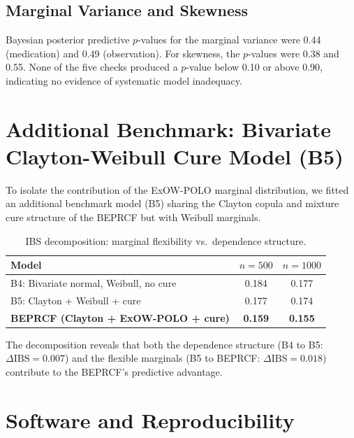 \documentclass[12pt,a4paper]{article}
\begin{document}
\subsection{Marginal Variance and Skewness}

Bayesian posterior predictive $p$-values for the marginal variance were 0.44 (medication) and 0.49 (observation). For skewness, the $p$-values were 0.38 and 0.55. None of the five checks produced a $p$-value below 0.10 or above 0.90, indicating no evidence of systematic model inadequacy.

\section{Additional Benchmark: Bivariate Clayton-Weibull Cure Model (B5)}
\label{sec:S12}

To isolate the contribution of the ExOW-POLO marginal distribution, we fitted an additional benchmark model (B5) sharing the Clayton copula and mixture cure structure of the BEPRCF but with Weibull marginals.

\begin{table}[H]
\centering
\caption{IBS decomposition: marginal flexibility vs.\ dependence structure.}
\label{tab:S12}
\begin{tabular}{lcc}
\toprule
\textbf{Model} & $n = 500$ & $n = 1000$ \\
\midrule
B4: Bivariate normal, Weibull, no cure & 0.184 & 0.177 \\
B5: Clayton + Weibull + cure & 0.177 & 0.174 \\
\textbf{BEPRCF (Clayton + ExOW-POLO + cure)} & \textbf{0.159} & \textbf{0.155} \\
\bottomrule
\end{tabular}
\end{table}

The decomposition reveals that both the dependence structure (B4 to B5: $\Delta\text{IBS} = 0.007$) and the flexible marginals (B5 to BEPRCF: $\Delta\text{IBS} = 0.018$) contribute to the BEPRCF's predictive advantage.

\section{Software and Reproducibility}
\end{document}
